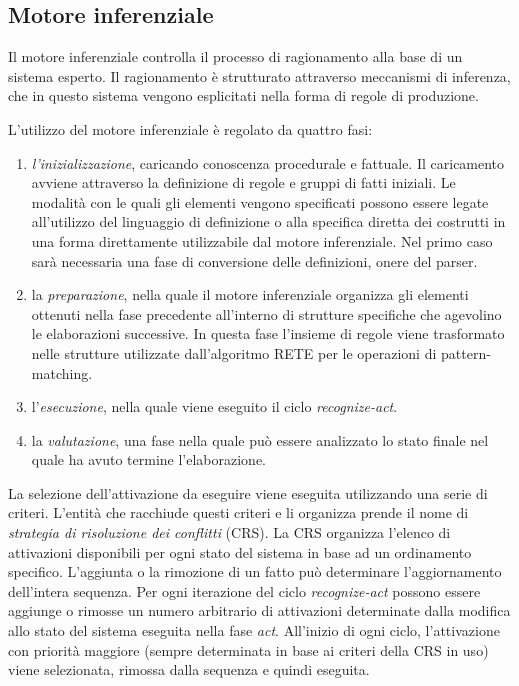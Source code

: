 \subsection{Motore inferenziale}\label{par:motore-inferenziale}

Il motore inferenziale controlla il processo di ragionamento alla base di un sistema esperto. Il ragionamento è strutturato attraverso meccanismi di inferenza, che in questo sistema vengono esplicitati nella forma di regole di produzione.

L'utilizzo del motore inferenziale è regolato da quattro fasi:

\begin{enumerate}
	\item \emph{l'inizializzazione}, caricando conoscenza procedurale e fattuale. Il caricamento avviene attraverso la definizione di regole e gruppi di fatti iniziali. Le modalità con le quali gli elementi vengono specificati possono essere legate all'utilizzo del linguaggio di definizione o alla specifica diretta dei costrutti in una forma direttamente utilizzabile dal motore inferenziale. Nel primo caso sarà necessaria una fase di conversione delle definizioni, onere del parser.
	\item la \emph{preparazione}, nella quale il motore inferenziale organizza gli elementi ottenuti nella fase precedente all'interno di strutture specifiche che agevolino le elaborazioni successive. In questa fase l'insieme di regole viene trasformato nelle strutture utilizzate dall'algoritmo RETE per le operazioni di pattern-matching.
	\item l'\emph{esecuzione}, nella quale viene eseguito il ciclo \emph{recognize-act}.
	\item la \emph{valutazione}, una fase nella quale può essere analizzato lo stato finale nel quale ha avuto termine l'elaborazione.
\end{enumerate}

La selezione dell'attivazione da eseguire viene eseguita utilizzando una serie di criteri. L'entità che racchiude questi criteri e li organizza prende il nome di \emph{strategia di risoluzione dei conflitti} (CRS). La CRS organizza l'elenco di attivazioni disponibili per ogni stato del sistema in base ad un ordinamento specifico. L'aggiunta o la rimozione di un fatto può determinare l'aggiornamento dell'intera sequenza. Per ogni iterazione del ciclo \emph{recognize-act} possono essere aggiunge o rimosse un numero arbitrario di attivazioni determinate dalla modifica allo stato del sistema eseguita nella fase \emph{act}. All'inizio di ogni ciclo, l'attivazione con priorità maggiore (sempre determinata in base ai criteri della CRS in uso) viene selezionata, rimossa dalla sequenza e quindi eseguita.

